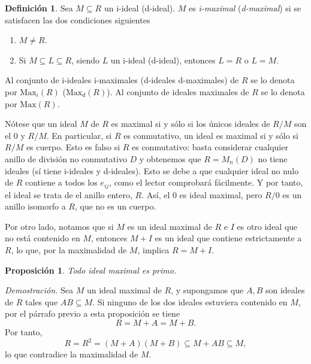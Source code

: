 \documentclass[11pt]{book}
\def\Max{\mathrm{Max}}
\newtheorem{prop}[theorem]{Proposición}
\theoremstyle{definition}
\newtheorem{definition}{Definición}[section]
\begin{document}
\begin{definition}
    Sea $M\subseteq R$ un i-ideal (d-ideal). $M$ es \textit{i-maximal} (\textit{d-maximal}) si se satisfacen las dos condiciones siguientes\begin{enumerate}
        \item $M\neq R$.
        \item Si $M\subseteq L\subseteq R$, siendo $L$ un i-ideal (d-ideal), entonces $L=R$ o $L=M$.
    \end{enumerate}
Al conjunto de i-ideales i-maximales (d-ideales d-maximales) de $R$ se lo denota por $\Max_i(R)$ ($\Max_d(R)$). Al conjunto de ideales maximales de $R$ se lo denota por $\Max(R)$.
\end{definition}

Nótese que un ideal $M$ de $R$ es maximal si y sólo si los únicos ideales de $R/M$ son el 0 y $R/M$. En particular, si $R$ es conmutativo, un ideal es maximal si y sólo si $R/M$ es cuerpo. Esto es falso si $R$ es conmutativo: basta considerar cualquier anillo de división no conmutativo $D$ y obtenemos que $R=M_n(D)$ no tiene ideales (sí tiene i-ideales y d-ideales). Esto se debe a que cualquier ideal no nulo de $R$ contiene a todos los $e_{ij}$, como el lector comprobará fácilmente. Y por tanto, el ideal se trata de el anillo entero, $R$. Así, el 0 es ideal maximal, pero $R/0$ es un anillo isomorfo a $R$, que no es un cuerpo.

Por otro lado, notamos que si $M$ es un ideal maximal de $R$ e $I$ es otro ideal que no está contenido en $M$, entonces $M+I$ es un ideal que contiene estrictamente a $R$, lo que, por la maximalidad de $M$, implica $R=M+I$.

\begin{prop}
    Todo ideal maximal es primo.
\end{prop}
\noindent\textit{Demostración.} Sea $M$ un ideal maximal de $R$, y supongamos que $A,B$ son ideales de $R$ tales que $AB\subseteq M$. Si ninguno de los dos ideales estuviera contenido en $M$, por el párrafo previo a esta proposición se tiene\[
R=M+A=M+B.
\]Por tanto,\[
R=R^2=(M+A)(M+B)\subseteq M+AB\subseteq M,
\]lo que contradice la maximalidad de $M$.
\end{document}
